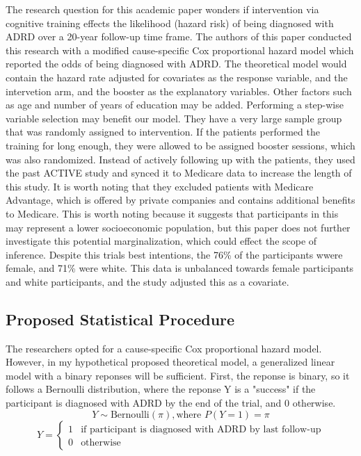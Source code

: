 \documentclass[11pt]{article}
\begin{document}
The research question for this academic paper wonders if intervention via cognitive training effects the likelihood (hazard risk) of being diagnosed with ADRD over a 20-year follow-up time frame. 
The authors of this paper conducted this research with a modified cause-specific Cox proportional hazard model which reported the odds of being diagnosed with ADRD.
The theoretical model would contain the hazard rate adjusted for covariates as the response variable, and the intervetion arm, and the booster as the explanatory variables. 
Other factors such as age and number of years of education may be added.
Performing a step-wise variable selection may benefit our model.
They have a very large sample group that was randomly assigned to intervention.
If the patients performed the training for long enough, they were allowed to be assigned booster sessions, which was also randomized.
Instead of actively following up with the patients, they used the past ACTIVE study and synced it to Medicare data to increase the length of this study.
It is worth noting that they excluded patients with Medicare Advantage, which is offered by private companies and contains additional benefits to Medicare. This is worth noting because it suggests that participants in this may represent a lower socioeconomic population, but this paper does not further investigate this potential marginalization, which could effect the scope of inference. Despite this trials best intentions, the 76\% of the participants wwere female, and 71\% were white. This data is unbalanced towards female participants and white participants, and the study adjusted this as a covariate.


\subsection{Proposed Statistical Procedure}
\label{sec:orgd704f98}

The researchers opted for a cause-specific Cox proportional hazard model. However, in my hypothetical proposed theoretical model, a generalized linear model with a binary reponses will be sufficient.
First, the reponse is binary, so it follows a Bernoulli distribution, where the reponse Y is a "success" if the participant is diagnosed with ADRD by the end of the trial, and 0 otherwise.
\[ Y \sim \text{Bernoulli}(\pi), \text{where } P(Y=1) = \pi \]
\[
Y = \begin{cases} 1 & \text{if participant is diagnosed with ADRD by last follow-up} \\ 0 & \text{otherwise} \end{cases}
\]
\end{document}
